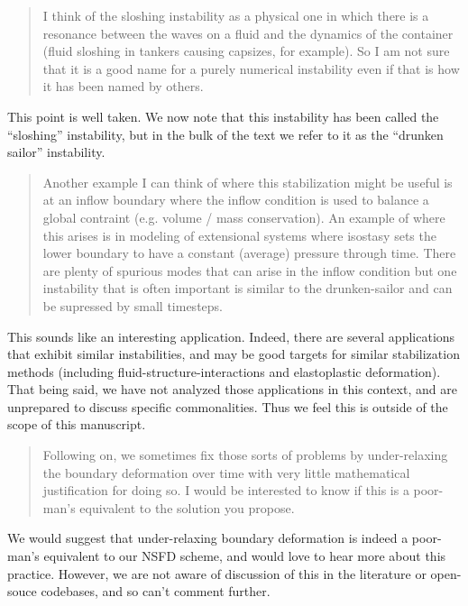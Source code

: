 \documentclass[a4paper,12pt]{article}
\begin{document}
\begin{quotation}
I think of the sloshing instability as a physical one in which there is a resonance between the waves on a fluid and the dynamics of the container (fluid sloshing in tankers causing capsizes, for example). So I am not sure that it is a good name for a purely numerical instability even if that is how it has been named by others.
\end{quotation}

This point is well taken. We now note that this instability has been called the ``sloshing'' instability,
but in the bulk of the text we refer to it as the ``drunken sailor'' instability.

\begin{quotation}
Another example I can think of where this stabilization might be useful is at an inflow boundary where the inflow condition is used to balance a global contraint (e.g. volume / mass conservation). An example of where this arises is in modeling of extensional systems where isostasy sets the lower boundary to have a constant (average) pressure through time. There are plenty of spurious modes that can arise in the inflow condition but one instability that is often important is similar to the drunken-sailor and can be supressed by small timesteps.
\end{quotation}
This sounds like an interesting application.
Indeed, there are several applications that exhibit similar instabilities, 
and may be good targets for similar stabilization methods 
(including fluid-structure-interactions and elastoplastic deformation).
That being said, we have not analyzed those applications in this context,
and are unprepared to discuss specific commonalities.
Thus we feel this is outside of the scope of this manuscript.


\begin{quotation}
Following on, we sometimes fix those sorts of problems by under-relaxing the boundary deformation over time with very little mathematical justification for doing so. I would be interested to know if this is a poor-man's equivalent to the solution you propose.
\end{quotation}

We would suggest that under-relaxing boundary deformation is indeed a poor-man's equivalent to our NSFD scheme,
and would love to hear more about this practice.
However, we are not aware of discussion of this in the literature or open-souce codebases, and so can't comment further.
\end{document}
